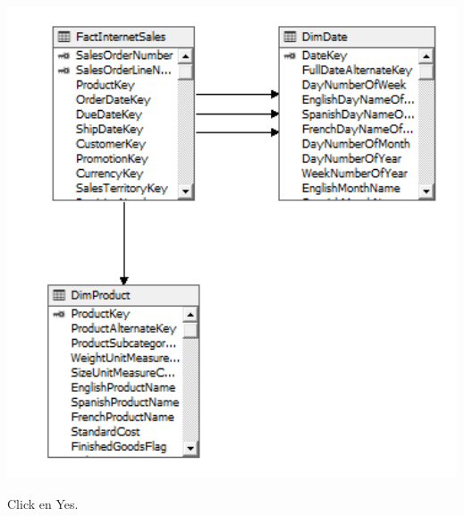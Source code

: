 	\begin{center}
	\includegraphics[width=\columnwidth]{images/task2/img14}
    \end{center}	
    
Click en Yes.

